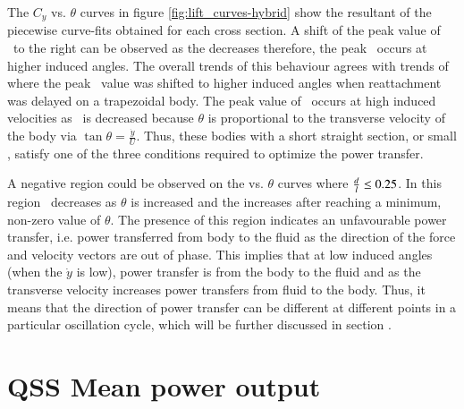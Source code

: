  

The $C_y$ vs. $\theta$ curves in figure \ref{fig:lift_curves-hybrid} show the resultant of the piecewise curve-fits obtained for each cross section. A shift of the peak value of \cy\ to the right can be observed as the \ratio decreases therefore, the peak \cy\ occurs at higher induced angles. The overall trends of this behaviour agrees with trends of \citet{Luo1994} where the peak \cy\ value was shifted to higher induced angles when reattachment was delayed on a trapezoidal body. The peak value of \cy\ occurs at high induced velocities as \ratio\ is decreased because $\theta$ is proportional to the transverse velocity of the body via $\tan{\theta}=\frac{\dot{y}}{U}$. Thus, these bodies with a short straight section, or small \ratio, satisfy one of the three conditions required to optimize the power transfer. 

A negative region could be observed on the \cy vs. $\theta$ curves  where $\frac{d}{l}\leq0.25$. In this region \cy\ decreases as $\theta$ is increased and the increases after reaching a minimum, non-zero value of $\theta$. The presence of this region indicates an unfavourable power transfer, i.e. power transferred from body to the fluid as the direction of the force and velocity vectors are out of phase. This implies that at low induced angles (when the $\dot{y}$ is low), power transfer is from the body to the fluid and as the transverse velocity increases power transfers from fluid to the body. Thus, it means that the direction of power transfer can be different at different points in a particular oscillation cycle, which will be further discussed in section . 



 \section{QSS Mean power output}
 \label{sec:mean power}
 
  
 
 
